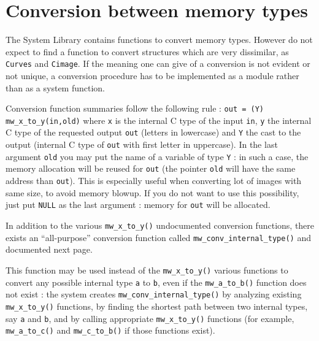 \section{Conversion between memory types}

\label{conv_memory_types}

The System Library contains functions to convert memory types. 
However do not expect to find a function to convert structures
which are very dissimilar, as \verb+Curves+ and \verb+Cimage+.
If the meaning one can give of a conversion is not evident or not unique,
a conversion procedure has to be implemented as a module rather than 
as a system function.

Conversion function summaries follow the following rule :
\verb+out = (Y) mw_x_to_y(in,old)+ where \verb+x+ is the internal C type of the
input \verb+in+, \verb+y+ the internal C type of the requested output 
\verb+out+ (letters in lowercase) and \verb+Y+ the cast to the output 
(internal C type of \verb+out+ with first letter in uppercase).
In the last argument \verb+old+ you may put the name of a variable of type \verb+Y+ :
in such a case, the memory allocation will be reused for \verb+out+ (the pointer
\verb+old+ will have the same address than \verb+out+). This is especially useful
when converting lot of images with same size, to avoid memory blowup. 
If you do not want to use this possibility, just put \verb+NULL+ as the last argument :
memory for \verb+out+ will be allocated.

In addition to the various \verb+mw_x_to_y()+ undocumented conversion 
functions, there exists an ``all-purpose'' conversion function called 
\verb+mw_conv_internal_type()+ and documented next page.

\newpage


\Description
This function may be used instead of the \verb+mw_x_to_y()+ various functions 
to convert any possible internal type \verb+a+ to \verb+b+, even if the 
\verb+mw_a_to_b()+ function does not exist : the system creates 
\verb+mw_conv_internal_type()+ by analyzing existing \verb+mw_x_to_y()+ 
functions, by finding the shortest path between two internal types, say
\verb+a+ and \verb+b+, and by calling appropriate \verb+mw_x_to_y()+ functions
(for example, \verb+mw_a_to_c()+ and  \verb+mw_c_to_b()+ if those functions exist).

